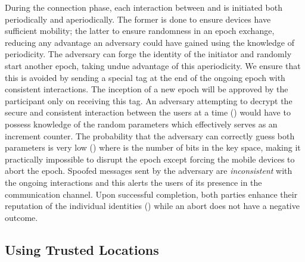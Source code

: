 \documentclass[letterpaper,twocolumn]{sig-alternate}
\begin{document}
During the connection phase, each interaction between  and  is initiated both periodically and aperiodically. The former is done to ensure devices have sufficient mobility; the latter to ensure randomness in an epoch exchange, reducing any advantage an adversary could have gained using the knowledge of periodicity. The adversary can forge the identity of the initiator and randomly start another epoch, taking undue advantage of this aperiodicity. We ensure that this is avoided by sending a special tag at the end of the ongoing epoch with consistent interactions. The inception of a new epoch will be approved by the participant only on receiving this tag. An adversary attempting to decrypt the secure and consistent interaction between the users at a time  () would have to possess knowledge of the random parameters which effectively serves as an increment counter. The probability that the adversary can correctly guess both parameters is very low () where  is the number of bits in the key space, making it practically impossible to disrupt the epoch except forcing the mobile devices to abort the epoch. Spoofed messages sent by the adversary are \textit{inconsistent} with the ongoing interactions and this alerts the users of its presence in the communication channel. Upon successful completion, both parties enhance their reputation of the individual identities () while an abort does not have a negative outcome.

\subsection{Using Trusted Locations} 
\label{tl}
\end{document}
